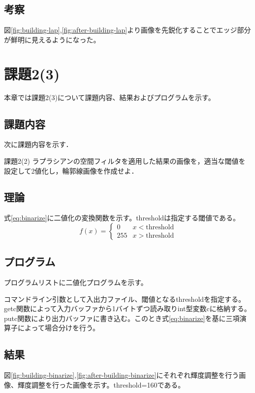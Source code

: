 \documentclass[11pt,a4paper,titlepage,dvipdfmx]{jarticle}
\begin{document}
  \subsection{考察}
    図\ref{fig:building-lap},\ref{fig:after-building-lap}より画像を先鋭化することでエッジ部分が鮮明に見えるようになった。

\section{課題2(3)}
  本章では課題2(3)について課題内容、結果およびプログラムを示す。
  \subsection{課題内容}
    次に課題内容を示す．
    \begin{itembox}[l]{課題2(2)}
      ラプラシアンの空間フィルタを適用した結果の画像を，適当な閾値を設定して2値化し，輪郭線画像を作成せよ．
    \end{itembox}
  \subsection{理論}
    式\eqref{eq:binarize}に二値化の変換関数を示す。thresholdは指定する閾値である。
    \begin{equation} \label{eq:binarize}
      f(x) = 
      \begin{cases}
      0   &   x < \text{threshold}  \\
      255        &  x > \text{threshold} 
      \end{cases}
    \end{equation} 
  \subsection{プログラム}
    プログラムリストに二値化プログラムを示す。
    
    コマンドライン引数として入出力ファイル、閾値となるthresholdを指定する。getc関数によって入力バッファから1バイトずつ読み取りint型変数cに格納する。
    putc関数により出力バッファに書き込む。このとき式\eqref{eq:binarize}を基に三項演算子によって場合分けを行う。
  \subsection{結果}
    図\ref{fig:building-binarize},\ref{fig:after-building-binarize}にそれぞれ輝度調整を行う画像、輝度調整を行った画像を示す。threshold=160である。
\end{document}
